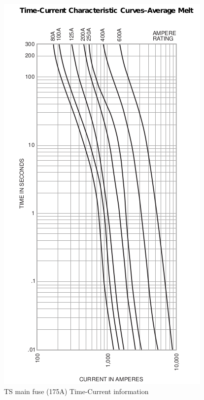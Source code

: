 \documentclass{article}
\begin{document}
            \begin{figure}[H]
                \centering
                \includegraphics[width = 0.25 \textheight]{TSfuseT-Agraph}
                \caption{TS main fuse (175A) Time-Current information}
                \label{TSi2t}
            \end{figure}
            
            
\end{document}
